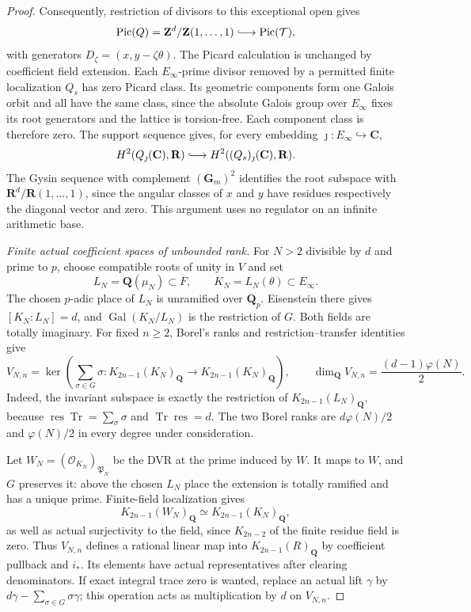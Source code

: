 \documentclass[11pt,a4paper]{article}
\theoremstyle{remark}
\newcommand{\Z}{\mathbf Z}
\newcommand{\Q}{\mathbf Q}
\newcommand{\R}{\mathbf R}
\newcommand{\C}{\mathbf C}
\newcommand{\Pic}{\operatorname{Pic}}
\begin{document}
\begin{proof}
Consequently, restriction of divisors to this exceptional open
gives
\[
 \Pic(Q)=\Z^d/\Z(1,\ldots,1)
       \lhook\joinrel\longrightarrow\Pic(\mathcal T),
\]
with generators $D_\zeta=(x,y-\zeta\theta)$.
The Picard calculation is unchanged by coefficient field
extension. Each $E_\infty$-prime divisor removed by a permitted
finite localization $Q_s$ has zero Picard class. Its geometric
components form one Galois orbit and all have the same class,
since the absolute Galois group over $E_\infty$ fixes its root
generators and the lattice is
torsion-free. Each component class is therefore zero.
The support sequence gives, for every embedding
$\jmath:E_\infty\hookrightarrow\C$,
\begin{equation}
 H^2(Q_\jmath(\C),\R)
      \lhook\joinrel\longrightarrow H^2((Q_s)_\jmath(\C),\R).
 \label{eq:strictcoefficientbetti}
\end{equation}
The Gysin sequence with complement $(\mathbf G_m)^2$ identifies
the root subspace with $\R^d/\R(1,\ldots,1)$, since the
angular classes of $x$ and $y$ have residues respectively the
diagonal vector and zero. This argument uses no regulator on
an infinite arithmetic base.

\emph{Finite actual coefficient spaces of unbounded rank.}
For $N>2$ divisible by $d$ and prime to $p$, choose compatible
roots of unity in $V$ and set
\[
 L_N=\Q(\mu_N)\subset F,\qquad K_N=L_N(\theta)\subset E_\infty .
\]
The chosen $p$-adic place of $L_N$ is unramified over $\Q_p$.
Eisenstein there gives $[K_N:L_N]=d$, and
$\operatorname{Gal}(K_N/L_N)$ is the restriction of $G$. Both fields
are totally imaginary. For fixed $n\ge2$, Borel's ranks and
restriction--transfer identities give
\begin{equation}
 V_{N,n}=
 \ker\!\left(\sum_{\sigma\in G}\sigma:
       K_{2n-1}(K_N)_{\Q}\to K_{2n-1}(K_N)_{\Q}\right),
 \qquad
 \dim_{\Q}V_{N,n}=\frac{(d-1)\varphi(N)}2.
 \label{eq:strictcoefficientrank}
\end{equation}
Indeed, the invariant subspace is exactly the restriction of
$K_{2n-1}(L_N)_{\Q}$, because
$\operatorname{res}\operatorname{Tr}=\sum_\sigma\sigma$ and
$\operatorname{Tr}\operatorname{res}=d$.
The two Borel ranks are $d\varphi(N)/2$ and $\varphi(N)/2$
in every degree under consideration.

Let $W_N=(\mathcal O_{K_N})_{\mathfrak P_N}$ be the DVR
at the prime induced by $W$. It maps to $W$, and $G$ preserves
it: above the chosen $L_N$ place the extension is totally
ramified and has a unique prime. Finite-field localization
gives
\[
 K_{2n-1}(W_N)_{\Q}\simeq K_{2n-1}(K_N)_{\Q},
\]
as well as actual surjectivity to the field, since
$K_{2n-2}$ of the finite residue field is zero.
Thus $V_{N,n}$ defines a rational linear map into
$K_{2n-1}(R)_{\Q}$ by coefficient pullback and $i_*$.
Its elements have actual representatives after clearing
denominators. If exact integral trace zero is wanted, replace
an actual lift $\gamma$ by
$d\gamma-\sum_{\sigma\in G}\sigma\gamma$; this operation
acts as multiplication by $d$ on $V_{N,n}$.


\end{proof}
\end{document}
